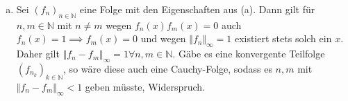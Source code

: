 \documentclass{article}
\theoremstyle{definition}
\newcommand{\N}{\mathbb{N}}
\begin{document}
\begin{enumerate}[(a)]
\begin{proof}
\begin{align*}
				\frac{1}{ (n +1)(n+2)} &<\frac{1}{n(n+1)}\\
				\frac{(n+2) - (n+1)}{ (n +1)(n+2)} &<\frac{(n+1) - n}{n(n+1)}\\
				\frac{1}{n+1} - \frac{1}{n+2} &< \frac{1}{n} - \frac{1}{n+1}\\
				\frac{2}{n+1} + \frac{1}{n+1} - \frac{1}{n+2} &< \frac{2}{n} - \frac{1}{n} + \frac{1}{n+1}\\
				\frac{1}{n+1} + \frac{\frac{1}{n+1} - \frac{1}{n+2}}{2} &< \frac{1}{n} - \frac{\frac{1}{n} + \frac{1}{n+1}}{2}\\
				\max I_{n+1} &< \min I_n
			\end{align*}
		\end{proof}
	\item Sei $(f_n)_{n\in\N}$ eine Folge mit den Eigenschaften aus (a). Dann gilt für $n,m\in\N$ mit $n\neq m$ wegen $f_n(x)f_m(x)=0$ auch $f_n(x) = 1 \implies f_m(x) = 0$ und wegen $\Vert f_n \Vert_\infty = 1$ existiert stets solch ein $x$. Daher gilt $\Vert f_n-f_m\Vert_{\infty}=1 \forall n, m \in \N$. Gäbe es eine konvergente Teilfolge $(f_{n_k})_{k\in \N}$, so wäre diese auch eine Cauchy-Folge, sodass es $n, m$ mit $\Vert f_n - f_m\Vert_\infty < 1$ geben müsste, Widerspruch.
	\end{enumerate}
\end{document}
